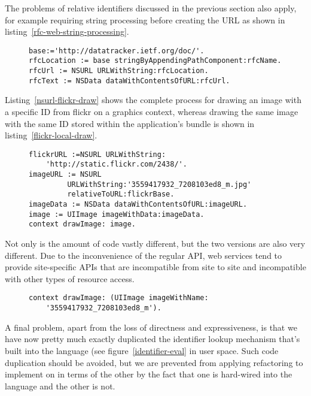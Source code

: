 \documentclass[preprint,authoryear]{acm_proc_article-sp}
\begin{document}
The problems of relative identifiers discussed in the previous section also apply, for example requiring
string processing before creating the URL as shown in listing~\ref{rfc-web-string-processing}.  


\begin{figure}[htbp]
\begin{lstlisting}[style=numbers,label=rfc-web-string-processing,caption=Retrieving a specific RFC (I).]
base:='http://datatracker.ietf.org/doc/'.
rfcLocation := base stringByAppendingPathComponent:rfcName.
rfcUrl := NSURL URLWithString:rfcLocation.
rfcText := NSData dataWithContentsOfURL:rfcUrl.
\end{lstlisting}
\end{figure}

 Listing~\ref{nsurl-flickr-draw}
shows the complete process for drawing an image with a specific ID from flickr on a graphics context,
whereas drawing the same image with the same ID stored within the application's bundle
is shown in listing~\ref{flickr-local-draw}.

\begin{figure}[htbp]
\begin{lstlisting}[style=numbers,label=nsurl-flickr-draw,caption=Retrieving and drawing a remote image.]
flickrURL :=NSURL URLWithString:
	'http://static.flickr.com/2438/'.
imageURL := NSURL 
         URLWithString:'3559417932_7208103ed8_m.jpg' 
         relativeToURL:flickrBase.
imageData := NSData dataWithContentsOfURL:imageURL.
image := UIImage imageWithData:imageData.
context drawImage: image.
\end{lstlisting}
\end{figure}

Not only is the amount of code vastly different, but the two versions are also very different.  Due to the inconvenience
of the regular API, web services tend to provide site-specific APIs that are incompatible from site to site and 
incompatible with other types of resource access.

\begin{figure}[htbp]
\begin{lstlisting}[style=numbers,label=flickr-local-draw,caption=Retrieving and drawing a local image.]
context drawImage: (UIImage imageWithName:
	'3559417932_7208103ed8_m').
\end{lstlisting}
\end{figure}

A final problem, apart from the loss of directness and expressiveness, is that we have now pretty
much exactly duplicated the identifier lookup mechanism that's built into the language (see figure~\ref{identifier-eval}
in user space.  Such code duplication should be avoided, but we are prevented from applying refactoring
to implement on in terms of the other by the fact that one is hard-wired into the language and the other is not.
\end{document}
